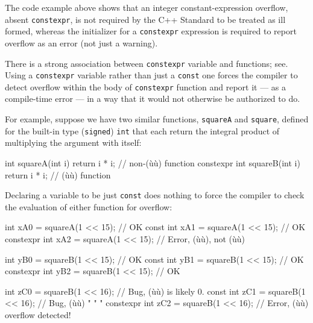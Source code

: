 \noindent The code example above shows that an integer constant-expression
overflow, absent \lstinline!constexpr!, is not required by the C++ Standard
to be treated as ill formed, whereas the initializer for a
\lstinline!constexpr! expression is required to report overflow as an error
(not just a warning).

There is a strong association between \lstinline!constexpr! variable and
functions; see\linebreak[4]%
. Using a
\lstinline!constexpr! variable rather than just a \lstinline!const! one forces the
compiler to detect overflow within the body of \lstinline!constexpr!
function and report it --- as a compile-time error --- in a way that it
would not otherwise be authorized to do.

For example, suppose we have two similar functions, \lstinline!squareA! and
\lstinline!square!, defined for the built-in type (\lstinline!signed!)
\lstinline!int! that each return the integral product of multiplying the
argument with itself:

\begin{emcppslisting}[emcppsbatch=e2]
          int squareA(int i) { return i * i; }  // non-(ù{}ù) function
constexpr int squareB(int i) { return i * i; }  // (ù{}ù) function
\end{emcppslisting}
    
\noindent Declaring a variable to be just \lstinline!const! does nothing to force the
compiler to check the evaluation of either function for overflow:

\begin{emcppslisting}[emcppsbatch=e2]
                int xA0 = squareA(1 << 15);  // OK
          const int xA1 = squareA(1 << 15);  // OK
constexpr       int xA2 = squareA(1 << 15);  // Error, (ù{}ù), not (ù{}ù)

                int yB0 = squareB(1 << 15);  // OK
          const int yB1 = squareB(1 << 15);  // OK
constexpr       int yB2 = squareB(1 << 15);  // OK

                int zC0 = squareB(1 << 16);  // Bug, (ù{}ù) is likely 0.
          const int zC1 = squareB(1 << 16);  // Bug, (ù{}ù)  "   "    "
constexpr       int zC2 = squareB(1 << 16);  // Error, (ù{}ù) overflow detected!
\end{emcppslisting}
    
